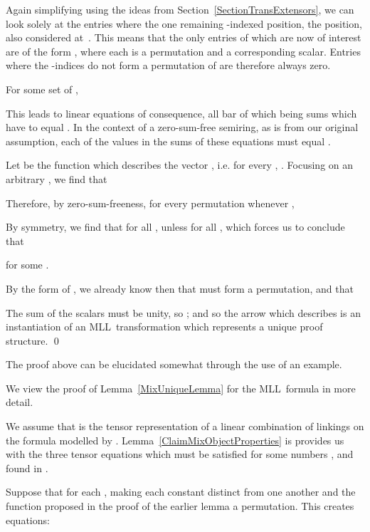 \documentclass{LMCS}
\theoremstyle{plain}\newtheorem*{cLm}{Claim}
\newcommand{\mll}{MLL} \newcommand{\mall}{MALL}
\newcommand{\p}{} \newcommand{\N}{\mathbb{N}}
\begin{document}
    Again simplifying using the ideas from Section~\ref{SectionTransExtensors}, we can look solely at the entries where the one remaining -indexed position, the  position, also considered at~. This means that the only entries of  which are now of interest are of the form , where each  is a permutation and  a corresponding scalar. Entries where the -indices do not form a permutation of  are therefore always zero.
    
    \p For some set of ,
    
    This leads to  linear equations of consequence, all bar  of which being sums which have to equal . In the context of a zero-sum-free semiring, as  is from our original assumption, each of the values in the sums of these  equations must equal .
    
    Let  be the function which describes the vector , i.e. for every , . Focusing on an arbitrary , we find that
    
    Therefore, by zero-sum-freeness, for every permutation  whenever ,
    
    
    By symmetry, we find that for all ,  unless  for all , which forces us to conclude that
    
    for some .
    
    \p By the form of , we already know then that  must form a permutation, and that
    
    The sum of the scalars must be unity, so ; and so the arrow which  describes is an instantiation of an \mll~transformation which represents a unique proof structure. \qed
    












    The proof above can be elucidated somewhat through the use of an example.
    
    \begin{exa} \label{MixUniqueExam}
    We view the proof of Lemma~\ref{MixUniqueLemma} for the \mll~formula  in more detail.
    \end{exa}
    We assume that  is the tensor representation of a linear combination of linkings on the formula modelled by . Lemma~\ref{ClaimMixObjectProperties} is provides us with the three tensor equations which must be satisfied for some numbers ,  and  found in .
    
    
\noindent     Suppose that  for each , making each constant distinct from one another and the function  proposed in the proof of the earlier lemma a permutation. This creates  equations:
    
\end{document}
